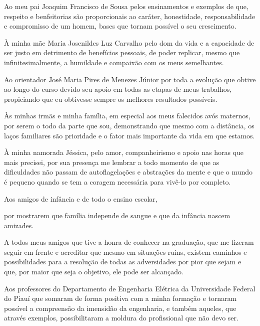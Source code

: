 Ao meu pai Joaquim Francisco de Sousa pelos ensinamentos e exemplos de que, respeito e benfeitorias são proporcionais ao caráter, honestidade, responsabilidade e compromisso de um homem, bases que tornam possível o seu crescimento.

À minha mãe Maria Josenildes Luz Carvalho pelo dom da vida e a capacidade de ser justo em detrimento de benefícios pessoais, de poder replicar, mesmo que infinitesimalmente, a humildade e compaixão com os meus semelhantes.

Ao orientador José Maria Pires de Menezes Júnior por toda a evolução que obtive ao longo do curso devido seu apoio em todas as etapas de meus trabalhos, propiciando que eu obtivesse sempre os melhores resultados possíveis.

Às minhas irmãs e minha família, em especial aos meus falecidos avós maternos, por serem o todo da parte que sou, demonstrando que mesmo com a distância, os laços familiares são prioridade e o fator mais importante da vida em que estamos.

À minha namorada Jéssica, pelo amor, companheirismo e apoio nas horas que mais precisei, por sua presença me lembrar a todo momento de que as dificuldades não passam de autoflagelações e abstrações da mente e que o mundo é pequeno quando se tem a coragem necessária para vivê-lo por completo.

Aos amigos de infância e de todo o ensino escolar, 

por mostrarem que família independe de sangue e que da infância nascem amizades.

A todos meus amigos que tive a honra de conhecer na graduação, que me fizeram seguir em frente e acreditar que mesmo em situações ruins, existem caminhos e possibilidades para a resolução de todas as adversidades por pior que sejam e que, por maior que seja o objetivo, ele pode ser alcançado.

Aos professores do Departamento de Engenharia Elétrica da Universidade Federal do Piauí que somaram de forma positiva com a minha formação e tornaram possível a compreensão da imensidão da engenharia, e também aqueles, que através exemplos, possibilitaram a moldura do profissional que não devo ser.